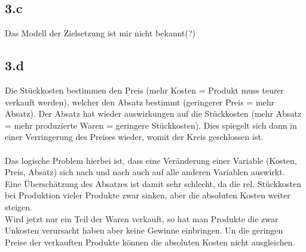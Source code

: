\subsection*{3.c}
Das Modell der Zielsetzung ist mir nicht bekannt(?) \\

\subsection*{3.d}
Die Stückkosten bestimmen den Preis (mehr Kosten = Produkt muss teurer verkauft werden), welcher den Absatz bestimmt (geringerer Preis = mehr Absatz). Der Absatz hat wieder auswirkungen auf die Stückkosten (mehr Absatz = mehr produzierte Waren = geringere Stückkosten). Dies spiegelt sich dann in einer Verringerung des Preises wieder, womit der Kreis geschlossen ist. \\
\ \\
Das logische Problem hierbei ist, dass eine Veränderung einer Variable (Kosten, Preis, Absatz) sich nach und nach auch auf alle anderen Variablen auswirkt. \\
Eine Überschätzung des Absatzes ist damit sehr schlecht, da die rel. Stückkosten bei Produktion vieler Produkte zwar sinken, aber die absoluten Kosten weiter steigen. \\
Wird jetzt nur ein Teil der Waren verkauft, so hat man Produkte die zwar Unkosten verursacht haben aber keine Gewinne einbringen. Un die geringen Preise der verkauften Produkte können die absoluten Kosten nicht ausgleichen.